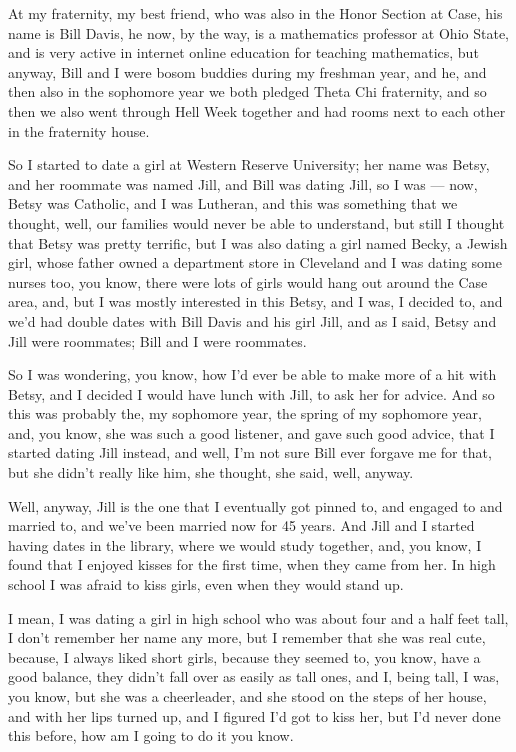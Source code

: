 \documentclass[]{article}
\begin{document}
At my fraternity, my best friend, who was also in the Honor Section at
Case, his name is Bill Davis, he now, by the way, is a mathematics
professor at Ohio State, and is very active in internet online education
for teaching mathematics, but anyway, Bill and I were bosom buddies
during my freshman year, and he, and then also in the sophomore year we
both pledged Theta Chi fraternity, and so then we also went through Hell
Week together and had rooms next to each other in the fraternity house.

So I started to date a girl at Western Reserve University; her name was
Betsy, and her roommate was named Jill, and Bill was dating Jill, so I
was --- now, Betsy was Catholic, and I was Lutheran, and this was
something that we thought, well, our families would never be able to
understand, but still I thought that Betsy was pretty terrific, but I
was also dating a girl named Becky, a Jewish girl, whose father owned a
department store in Cleveland and I was dating some nurses too, you
know, there were lots of girls would hang out around the Case area, and,
but I was mostly interested in this Betsy, and I was, I decided to, and
we'd had double dates with Bill Davis and his girl Jill, and as I said,
Betsy and Jill were roommates; Bill and I were roommates.

So I was wondering, you know, how I'd ever be able to make more of a hit
with Betsy, and I decided I would have lunch with Jill, to ask her for
advice. And so this was probably the, my sophomore year, the spring of
my sophomore year, and, you know, she was such a good listener, and gave
such good advice, that I started dating Jill instead, and well, I'm not
sure Bill ever forgave me for that, but she didn't really like him, she
thought, she said, well, anyway.

Well, anyway, Jill is the one that I eventually got pinned to, and
engaged to and married to, and we've been married now for 45 years. And
Jill and I started having dates in the library, where we would study
together, and, you know, I found that I enjoyed kisses for the first
time, when they came from her. In high school I was afraid to kiss
girls, even when they would stand up.

I mean, I was dating a girl in high school who was about four and a half
feet tall, I don't remember her name any more, but I remember that she
was real cute, because, I always liked short girls, because they seemed
to, you know, have a good balance, they didn't fall over as easily as
tall ones, and I, being tall, I was, you know, but she was a
cheerleader, and she stood on the steps of her house, and with her lips
turned up, and I figured I'd got to kiss her, but I'd never done this
before, how am I going to do it you know.
\end{document}
